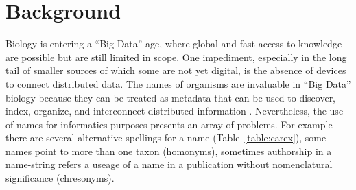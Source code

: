 \documentclass{bmcart}
\begin{document}
\section*{Background}

Biology is entering a ``Big Data'' age, where global and fast access to
knowledge are possible but are still limited in scope. One impediment,
especially in the long tail of smaller sources of which some are not yet
digital, is the absence of devices to connect distributed data.  The names of
organisms are invaluable in ``Big Data'' biology because they can be treated as
metadata that can be used to discover, index, organize, and interconnect
distributed information \cite{Patterson2010}.  Nevertheless, the use of names
for informatics purposes presents an array of problems. For example there are
several alternative spellings for a name (Table~\ref{table:carex}), some names
point to more than one taxon (homonyms), sometimes authorship in a name-string
refers a useage of a name in a publication without nomenclatural significance
(chresonyms).
\end{document}
